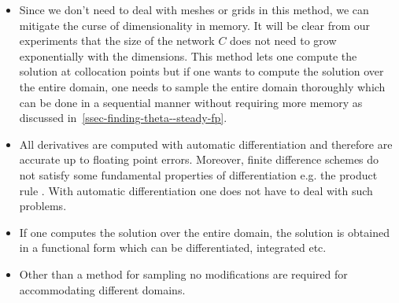 \begin{itemize}
    \item Since we don't need to deal with meshes or grids in this method, we can mitigate the curse of dimensionality in memory. It will be clear from our experiments that the size of the network $C$ does not need to grow exponentially with the dimensions. This method lets one compute the solution at collocation points but if one wants to compute the solution over the entire domain, one needs to sample the entire domain thoroughly which can be done in a sequential manner without requiring more memory as discussed in~\ref{ssec-finding-theta--steady-fp}.
    \item All derivatives are computed with automatic differentiation and therefore are accurate up to floating point errors. Moreover, finite difference schemes do not satisfy some fundamental properties of differentiation e.g. the product rule \cite{ranocha2019mimetic}. With automatic differentiation one does not have to deal with such problems. 
    \item If one computes the solution over the entire domain, the solution is obtained in a functional form which can be differentiated, integrated etc.
    \item Other than a method for sampling no modifications are required for accommodating different domains. 
\end{itemize}
